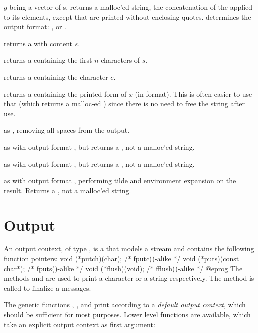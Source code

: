  $g$ being a vector of s,
returns a malloc'ed string, the concatenation of the  applied
to its elements, except that  are printed without enclosing quotes.
 determines the output format: , 
or .


 returns a  with content $s$.

returns a  containing the first $n$ characters of $s$.

 returns a  containing the character
$c$.

 returns a  containing the printed
form of $x$ (in  format). This is often easier to use that
 (which returns a malloc-ed ) since there is no need
to free the string after use.

 as , removing all
spaces from the output.

 as  with output format ,
but returns a , not a malloc'ed string.

 as  with output format ,
but returns a , not a malloc'ed string.

 as  with output format ,
performing tilde and environment expansion on the result. Returns a
, not a malloc'ed string.

\section{Output}


An output coutext, of type , is a 
that models a stream and contains the following function pointers:
\bprog
void (*putch)(char);           /* fputc()-alike */
void (*puts)(const char*);     /* fputs()-alike */
void (*flush)(void);           /* fflush()-alike */
@eprog\noindent
The methods  and  are used to print a character
or a string respectively.  The method  is called to finalize a
messages.

The generic functions , ,  and
 print according to a \emph{default output context}, which
should be sufficient for most purposes. Lower level functions are available,
which take an explicit output context as first argument:

